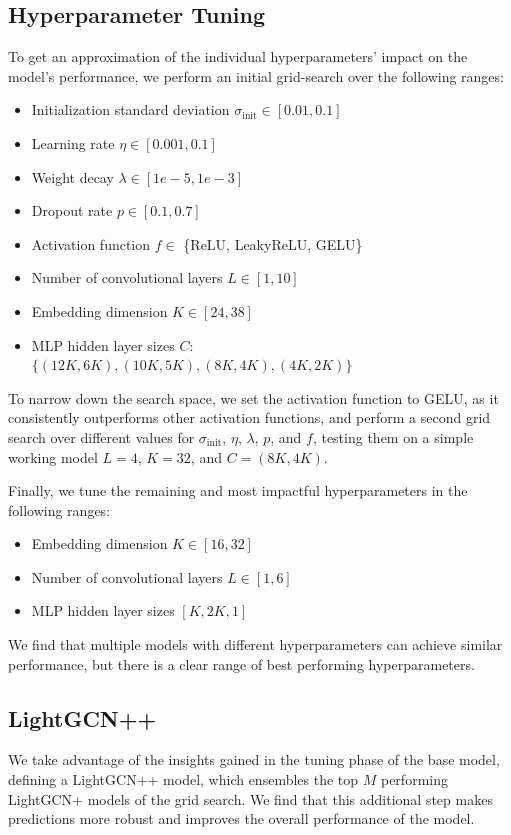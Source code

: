 \documentclass[10pt,conference,compsocconf]{IEEEtran}
\begin{document}
\subsection{Hyperparameter Tuning}
To get an approximation of the individual hyperparameters' impact on the model's performance, we perform an initial grid-search over the following ranges:
\begin{itemize}
  \item Initialization standard deviation $\sigma_{\text{init}} \in [0.01, 0.1]$
  \item Learning rate $\eta \in [0.001, 0.1]$
  \item Weight decay $\lambda \in [1e-5, 1e-3]$
  \item Dropout rate $p \in [0.1, 0.7]$
  \item Activation function $f \in$ \{ReLU, LeakyReLU, GELU\}
  \item Number of convolutional layers $L \in [1, 10]$
  \item Embedding dimension $K \in [24, 38]$
  \item MLP hidden layer sizes $C$: \\ $\{(12K,6K), (10K,5K), (8K,4K), (4K,2K)\}$
\end{itemize}

To narrow down the search space, we set the activation function to GELU, as it consistently outperforms other activation functions, and perform a second grid search over different values for $\sigma_{\text{init}}$, $\eta$, $\lambda$, $p$, and $f$, 
testing them on a simple working model $L=4$, $K=32$, and $C=(8K,4K)$.

Finally, we tune the remaining and most impactful hyperparameters in the following ranges:
\begin{itemize}
    \item Embedding dimension $K \in [16, 32]$
    \item Number of convolutional layers $L \in [1, 6]$
    \item MLP hidden layer sizes $[K, 2K, 1]$
\end{itemize}
We find that multiple models with different hyperparameters can achieve similar performance, but there is a clear range of best performing hyperparameters.

\subsection{LightGCN++}
We take advantage of the insights gained in the tuning phase of the base model, defining a LightGCN++ model, which ensembles the top $M$ performing LightGCN+ models of the grid search.
We find that this additional step makes predictions more robust and improves the overall performance of the model.
\end{document}

